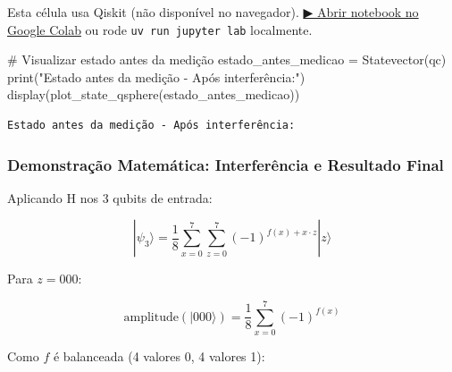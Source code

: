 \documentclass[
  brazilian,
]{report}
\newenvironment{Shaded}{\begin{snugshade}}{\end{snugshade}}
\newcommand{\BuiltInTok}[1]{\textcolor[rgb]{0.00,0.23,0.31}{#1}}
\newcommand{\CommentTok}[1]{\textcolor[rgb]{0.37,0.37,0.37}{#1}}
\newcommand{\NormalTok}[1]{\textcolor[rgb]{0.00,0.23,0.31}{#1}}
\newcommand{\OperatorTok}[1]{\textcolor[rgb]{0.37,0.37,0.37}{#1}}
\newcommand{\StringTok}[1]{\textcolor[rgb]{0.13,0.47,0.30}{#1}}
\begin{document}
\begin{tcolorbox}[enhanced jigsaw, arc=.35mm, bottomrule=.15mm, bottomtitle=1mm, breakable, colback=white, colbacktitle=quarto-callout-warning-color!10!white, colframe=quarto-callout-warning-color-frame, coltitle=black, left=2mm, leftrule=.75mm, opacityback=0, opacitybacktitle=0.6, rightrule=.15mm, title=\textcolor{quarto-callout-warning-color}{\faExclamationTriangle}\hspace{0.5em}{⚛️ Célula Qiskit --- execute no Colab ou localmente}, titlerule=0mm, toprule=.15mm, toptitle=1mm]

Esta célula usa Qiskit (não disponível no navegador).
\href{https://colab.research.google.com/github/maxwellamaral/aula-quantum/blob/main/notebooks/05-interference.ipynb}{▶
Abrir notebook no Google Colab} ou rode \texttt{uv\ run\ jupyter\ lab}
localmente.

\begin{Shaded}
\begin{Highlighting}[]

\CommentTok{\# Visualizar estado antes da medição}
\NormalTok{estado\_antes\_medicao }\OperatorTok{=}\NormalTok{ Statevector(qc)}
\BuiltInTok{print}\NormalTok{(}\StringTok{"Estado antes da medição {-} Após interferência:"}\NormalTok{)}
\NormalTok{display(plot\_state\_qsphere(estado\_antes\_medicao))}
\end{Highlighting}
\end{Shaded}

\end{tcolorbox}

\begin{verbatim}
Estado antes da medição - Após interferência:
\end{verbatim}

\subsubsection{Demonstração Matemática: Interferência e Resultado
Final}\label{demonstrauxe7uxe3o-matemuxe1tica-interferuxeancia-e-resultado-final}

Aplicando H nos 3 qubits de entrada:

\[|\psi_3\rangle = \frac{1}{8} \sum_{x=0}^{7} \sum_{z=0}^{7} (-1)^{f(x) + x \cdot z} |z\rangle\]

Para \(z = 000\):

\[\text{amplitude}(|000\rangle) = \frac{1}{8} \sum_{x=0}^{7} (-1)^{f(x)}\]

Como \(f\) é balanceada (4 valores 0, 4 valores 1):
\end{document}
